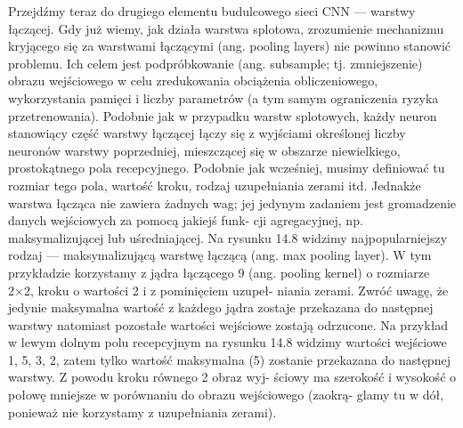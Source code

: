 \documentclass[12pt]{mwbk}
\theoremstyle{plain}
\theoremstyle{definition}
\theoremstyle{remark}
\begin{document}
Przejdźmy teraz do drugiego elementu budulcowego sieci CNN — warstwy łączącej.
Gdy już wiemy, jak działa warstwa splotowa, zrozumienie mechanizmu kryjącego się za warstwami
łączącymi (ang. pooling layers) nie powinno stanowić problemu. Ich celem jest podpróbkowanie
(ang. subsample; tj. zmniejszenie) obrazu wejściowego w celu zredukowania obciążenia obliczeniowego,
wykorzystania pamięci i liczby parametrów (a tym samym ograniczenia ryzyka przetrenowania).
Podobnie jak w przypadku warstw splotowych, każdy neuron stanowiący część warstwy łączącej
łączy się z wyjściami określonej liczby neuronów warstwy poprzedniej, mieszczącej się w obszarze
niewielkiego, prostokątnego pola recepcyjnego. Podobnie jak wcześniej, musimy definiować tu
rozmiar tego pola, wartość kroku, rodzaj uzupełniania zerami itd. Jednakże warstwa łącząca nie zawiera
żadnych wag; jej jedynym zadaniem jest gromadzenie danych wejściowych za pomocą jakiejś funk-
cji agregacyjnej, np. maksymalizującej lub uśredniającej. Na rysunku 14.8 widzimy najpopularniejszy
rodzaj — maksymalizującą warstwę łączącą (ang. max pooling layer). W tym przykładzie korzystamy
z jądra łączącego 9 (ang. pooling kernel) o rozmiarze 2×2, kroku o wartości 2 i z pominięciem uzupeł-
niania zerami. Zwróć uwagę, że jedynie maksymalna wartość z każdego jądra zostaje przekazana do
następnej warstwy natomiast pozostałe wartości wejściowe zostają odrzucone. Na przykład w lewym
dolnym polu recepcyjnym na rysunku 14.8 widzimy wartości wejściowe 1, 5, 3, 2, zatem tylko wartość
maksymalna (5) zostanie przekazana do następnej warstwy. Z powodu kroku równego 2 obraz wyj-
ściowy ma szerokość i wysokość o połowę mniejsze w porównaniu do obrazu wejściowego (zaokrą-
glamy tu w dół, ponieważ nie korzystamy z uzupełniania zerami).
\end{document}
